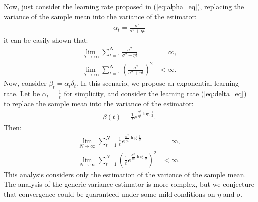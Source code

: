 Now, just consider the learning rate proposed in (\ref{eq:alpha_eq}), replacing the variance of the sample mean into the variance of the estimator:
\begin{align}\label{eq:alpha_smv}
 \alpha_t=\frac{\sigma^2}{\sigma^2+\eta t}
\end{align}
it can be easily shown that:
\begin{align}
 \lim_{N\rightarrow\infty} \sum_{t=1}^{N}\frac{\sigma^2}{\sigma^2+\eta t} & = \infty, \\
 \lim_{N\rightarrow\infty} \sum_{t=1}^{N}\left(\frac{\sigma^2}{\sigma^2+\eta t}\right)^2 & < \infty.
\end{align}
Now, consider $\beta_t=\alpha_t\delta_t$. In this scenario, we propose an exponential learning rate. Let be $\alpha_t=\frac{1}{t}$ for simplicity, and consider the learning rate (\ref{eq:delta_eq}) to replace the sample mean into the variance of the estimator:
\begin{align}\label{eq:beta_delta_smv}
 \beta(t) = \frac{1}{t}e^{\frac{\sigma^2}{\eta t}\log\frac{1}{2}}.
\end{align}
Then:
\begin{align}
 \lim_{N\rightarrow\infty} \sum_{t=1}^{N}\frac{1}{t}e^{\frac{\sigma^2}{\eta t}\log\frac{1}{2}} & = \infty, \\
 \lim_{N\rightarrow\infty} \sum_{t=1}^{N}\left(\frac{1}{t}e^{\frac{\sigma^2}{\eta t}\log\frac{1}{2}}\right)^2 & < \infty.
\end{align}
This analysis considers only the estimation of the variance of the sample mean. The analysis of the generic variance estimator is more complex, but we conjecture that convergence could be guaranteed under some mild conditions on $\eta$ and $\sigma$.

